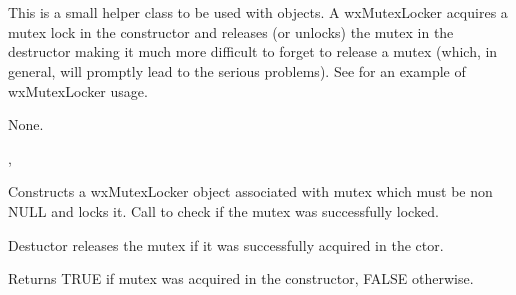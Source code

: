 \section{}\label{wxmutexlocker}

This is a small helper class to be used with  
objects. A wxMutexLocker acquires a mutex lock in the constructor and releases
(or unlocks) the mutex in the destructor making it much more difficult to
forget to release a mutex (which, in general, will promptly lead to the serious
problems). See  for an example of wxMutexLocker
usage.


None.


,


\label{wxmutexlockerctor}

Constructs a wxMutexLocker object associated with mutex which must be non NULL
and locks it. Call  to check if the mutex was
successfully locked.

\label{wxmutexlockerdtor}

Destuctor releases the mutex if it was successfully acquired in the ctor.

\label{wxmutexlockerisok}

Returns TRUE if mutex was acquired in the constructor, FALSE otherwise.
